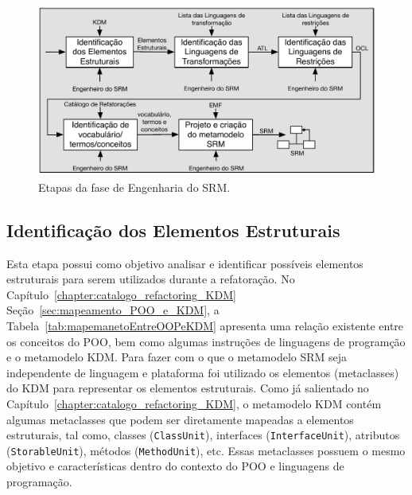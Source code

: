 \begin{figure}[h]
	\centering
	\caption{Etapas da fase de Engenharia do SRM.}
	\label{fig:etapas_da_fase_de_e_do_SRM}
	\includegraphics[scale=0.75]{images/todasAsFasesDaEngenhariaDOSRM6}
	\fautor
\end{figure}



\subsection{Identificação dos Elementos Estruturais}

Esta etapa possui como objetivo analisar e identificar possíveis elementos estruturais para serem utilizados durante a refatoração. No Capítulo~\ref{chapter:catalogo_refactoring_KDM} Seção~\ref{sec:mapeamento_POO_e_KDM}, a Tabela~\ref{tab:mapemanetoEntreOOPeKDM} apresenta uma relação existente entre os conceitos do POO, bem como algumas instruções de linguagens de programção e o metamodelo KDM. Para fazer com o que o metamodelo SRM seja independente de linguagem e plataforma foi utilizado os elementos (metaclasses) do KDM para representar os elementos estruturais. Como já salientado no Capítulo~\ref{chapter:catalogo_refactoring_KDM}, o metamodelo KDM contém algumas metaclasses que podem ser diretamente mapeadas a elementos estruturais, tal como, classes (\texttt{ClassUnit}), interfaces (\texttt{InterfaceUnit}), atributos (\texttt{StorableUnit}), métodos (\texttt{MethodUnit}), etc. Essas metaclasses possuem o mesmo objetivo e características dentro do contexto do POO e linguagens de programação. %


